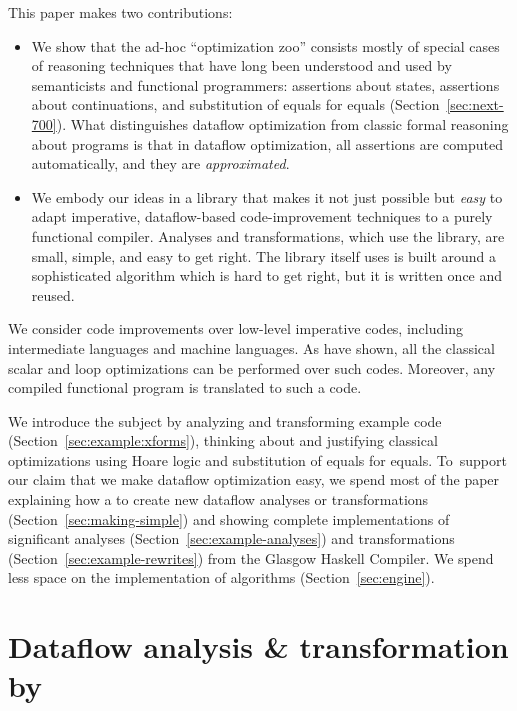 \documentclass[blockstyle,preprint,natbib,nocopyrightspace]{sigplanconf}
\newcommand\secref[1]{Section~\ref{sec:#1}}
\begin{document}
This paper makes two contributions:
\begin{itemize}
\item
We show that the ad-hoc ``optimization zoo'' consists mostly of special
cases of reasoning techniques that have long been understood and used
by semanticists and functional programmers:
assertions about states, assertions about continuations, and
substitution of equals for equals (\secref{next-700}).
What distinguishes dataflow optimization from classic formal reasoning
about programs is that in dataflow optimization, all assertions are
computed automatically, and they are
\emph{approximated}. 
\item
We embody our ideas in a library that makes it not just
possible but \emph{easy} to adapt imperative, dataflow-based
code-improvement techniques to a purely functional compiler.
Analyses and transformations, which use the library,
are small, simple, and easy to get right.
The library itself
\ifpagetuning uses \else is built around \fi
 a sophisticated algorithm which is
hard to get right, but it is 
written once and reused.
\end{itemize}

We consider code improvements over low-level
imperative codes, including intermediate languages and machine
languages.
As \citet{benitez-davidson:portable-optimizer} have shown, all the
classical scalar and loop optimizations can be performed over such
codes.
Moreover, any compiled functional program is
translated to such a code.


We introduce the subject by analyzing and transforming example code 
(\secref{example:xforms}),
thinking about and justifying classical optimizations using
Hoare logic and substitution of equals for equals.
To~support our claim that we make dataflow optimization easy, 
we spend most of the paper explaining how
a to create new dataflow analyses or transformations
(\secref{making-simple}) and showing complete implementations of significant
analyses (\secref{example-analyses}) and transformations
(\secref{example-rewrites}) from the Glasgow Haskell Compiler.
We spend less space on the implementation of algorithms (\secref{engine}).


\section{Dataflow analysis {\&} transformation by }
\end{document}

